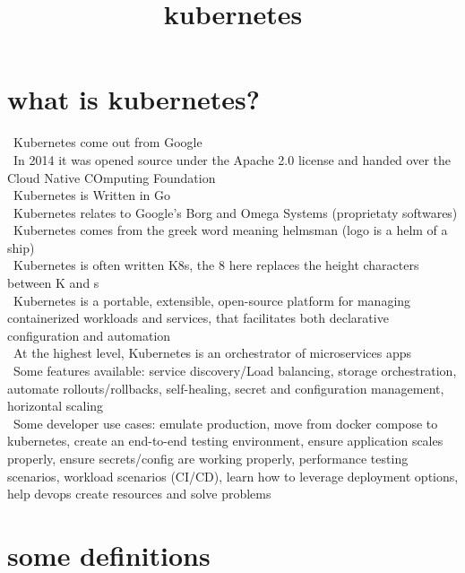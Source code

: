 \documentclass{refcard}
\title{kubernetes}
\begin{document}
\maketitle

\section{what is kubernetes?}

\textbullet\ Kubernetes come out from Google\\
\textbullet\ In 2014 it was opened source under the Apache 2.0 license and handed over the Cloud Native COmputing Foundation\\
\textbullet\ Kubernetes is Written in Go \\
\textbullet\ Kubernetes relates to Google's Borg and Omega Systems (proprietaty softwares)\\
\textbullet\ Kubernetes comes from the greek word meaning helmsman (logo is a helm of a ship)\\
\textbullet\ Kubernetes is often written K8s, the 8 here replaces the height characters between K and s\\
\textbullet\ Kubernetes is a portable, extensible, open-source platform for managing containerized workloads and services, that facilitates both declarative configuration and automation\\
\textbullet\ At the highest level, Kubernetes is an orchestrator of microservices apps\\

\textbullet\ Some features available: service discovery/Load balancing, storage orchestration, automate rollouts/rollbacks, self-healing, secret and configuration management, horizontal scaling\\
 
\textbullet\ Some developer use cases: emulate production, move from docker compose to kubernetes, create an end-to-end testing environment, ensure application scales properly, ensure secrets/config are working properly, performance testing scenarios, workload scenarios (CI/CD), learn how to leverage deployment options, help devops create resources and solve problems\\

\section{some definitions}
\end{document}

